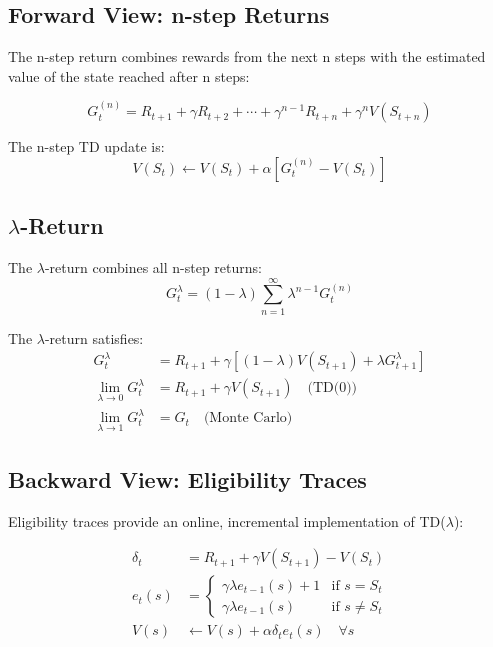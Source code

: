 \subsection{Forward View: n-step Returns}

The n-step return combines rewards from the next n steps with the estimated value of the state reached after n steps:

\begin{equation}
G_t^{(n)} = R_{t+1} + \gamma R_{t+2} + \cdots + \gamma^{n-1} R_{t+n} + \gamma^n V(S_{t+n})
\end{equation}

The n-step TD update is:
\begin{equation}
V(S_t) \leftarrow V(S_t) + \alpha[G_t^{(n)} - V(S_t)]
\end{equation}

\subsection{$\lambda$-Return}

The $\lambda$-return combines all n-step returns:
\begin{equation}
G_t^\lambda = (1-\lambda) \sum_{n=1}^\infty \lambda^{n-1} G_t^{(n)}
\end{equation}

\begin{theorem}
The $\lambda$-return satisfies:
\begin{align}
G_t^\lambda &= R_{t+1} + \gamma[(1-\lambda)V(S_{t+1}) + \lambda G_{t+1}^\lambda] \\
\lim_{\lambda \to 0} G_t^\lambda &= R_{t+1} + \gamma V(S_{t+1}) \quad \text{(TD(0))} \\
\lim_{\lambda \to 1} G_t^\lambda &= G_t \quad \text{(Monte Carlo)}
\end{align}
\end{theorem}

\subsection{Backward View: Eligibility Traces}

Eligibility traces provide an online, incremental implementation of TD($\lambda$):

\begin{align}
\delta_t &= R_{t+1} + \gamma V(S_{t+1}) - V(S_t) \\
e_t(s) &= \begin{cases}
\gamma \lambda e_{t-1}(s) + 1 & \text{if } s = S_t \\
\gamma \lambda e_{t-1}(s) & \text{if } s \neq S_t
\end{cases} \\
V(s) &\leftarrow V(s) + \alpha \delta_t e_t(s) \quad \forall s
\end{align}

